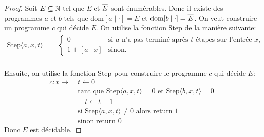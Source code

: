 \begin{proof}
    Soit \(E\subseteq \mathbb{N}\) tel que \(E\) et \(\overline{E}\) sont énumérables.
    Donc il existe des programmes \(a\) et \(b\) tels que
    \(\text{dom} [a \mid \cdot] = E\) et \(\text{dom} [b \mid \cdot] = \overline{E}\).
    On veut construire un programme \(c\) qui décide \(E\).
    On utilise la fonction \(\text{Step}\) de la manière suivante:
    \begin{align*}
        \text{Step}\langle a,x,t \rangle &= \begin{cases}
            0 & \text{si } a \text{ n'a pas terminé après } t \text{ étapes sur l'entrée } x, \\
            1 + [a \mid x] & \text{sinon}.
        \end{cases} \\
    \end{align*}

    Ensuite, on utilise la fonction \(\text{Step}\) pour construire le programme \(c\) qui décide \(E\):
    \begin{align*}
        c: x \mapsto\ & t \leftarrow 0 \\
        & \text{tant que } \text{Step}\langle a,x,t \rangle = 0 \text{ et } \text{Step}\langle b,x,t \rangle = 0 \\
        & \quad t \leftarrow t + 1 \\
        & \text{si } \text{Step}\langle a,x,t \rangle \neq 0 \text{ alors return } 1 \\
        & \text{sinon return } 0
    \end{align*}
    Donc \(E\) est décidable.
\end{proof}
